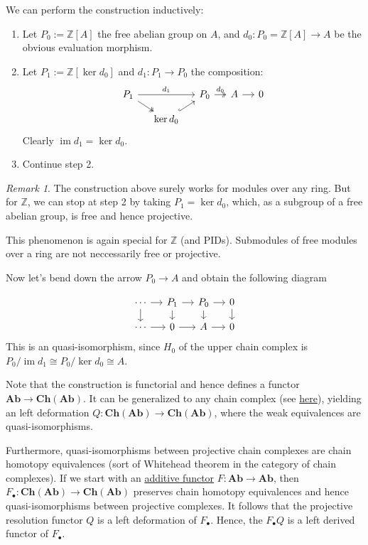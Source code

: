 \documentclass[11pt]{article}
\theoremstyle{definition}
\theoremstyle{remark}
\newtheorem{remark}[theorem]{Remark}
\newcommand{\im}{\operatorname{im}}
\newcommand{\Ch}{\mathbf{Ch}}
\newcommand{\Ab}{\mathbf{Ab}}
\begin{document}
We can perform the construction inductively:
\begin{enumerate}
    \item Let $P_0 := \mathbb Z[A]$ the free abelian group on $A$,
        and $d_0 : P_0 = \mathbb Z[A] \to A$ be the obvious evaluation morphism.
    \item Let $P_1 := \mathbb Z[\ker d_0]$ and $d_1 : P_1 \to P_0$ the composition:
        \[
        \begin{tikzcd}[sep=small]
            P_1 \arrow[rr, "d_1"] \arrow[dr, twoheadrightarrow] & &
                P_0 \arrow[r, "d_0", twoheadrightarrow] & A \arrow[r] & 0\\
             & \ker d_0 \arrow[ur, hookrightarrow] & & &
        \end{tikzcd}
        \]
        Clearly $\im d_1 = \ker d_0$.
    \item Continue step 2.
\end{enumerate}

\begin{remark}
    The construction above surely works for modules over any ring.
    But for $\mathbb Z$, we can stop at step 2 by taking $P_1 = \ker d_0$,
    which, as a subgroup of a free abelian group, is free and hence projective.

    This phenomenon is again special for $\mathbb Z$ (and PIDs).
    Submodules of free modules over a ring are not neccessarily free or projective.
\end{remark}

Now let's bend down the arrow $P_0 \to A$ and obtain the following diagram

\[
\begin{tikzcd}[sep=small]
    \cdots \arrow[r] \arrow[d] & P_1 \arrow[r]
        \arrow[d] & P_0 \arrow[r] \arrow[d] & 0 \arrow[d] \\
    \cdots \arrow[r] & 0 \arrow[r] & A \arrow[r] & 0
\end{tikzcd}
\]
This is an quasi-isomorphism, since $H_0$ of the upper chain complex is $P_0/\im d_1 \cong P_0/\ker d_0 \cong A$.

Note that the construction is functorial and hence defines a functor $\Ab \to \Ch(\Ab)$.
It can be generalized to any chain complex
(see \href{https://ncatlab.org/nlab/show/projective+resolution#ResolutionOfAChainComplex}{here}),
yielding an left deformation $Q : \Ch(\Ab) \to \Ch(\Ab)$, where the weak equivalences are quasi-isomorphisms.

Furthermore, quasi-isomorphisms between projective chain complexes are chain homotopy equivalences
(sort of Whitehead theorem in the category of chain complexes).
If we start with an \href{https://ncatlab.org/nlab/show/additive+functor}{additive functor}
$F : \Ab \to \Ab$, then $F_\bullet : \Ch(\Ab) \to \Ch(\Ab)$
preserves chain homotopy equivalences and hence quasi-isomorphisms between projective complexes.
It follows that the projective resolution functor $Q$ is a left deformation of $F_\bullet$.
Hence, the $F_\bullet Q$ is a left derived functor of $F_\bullet$.
\end{document}
